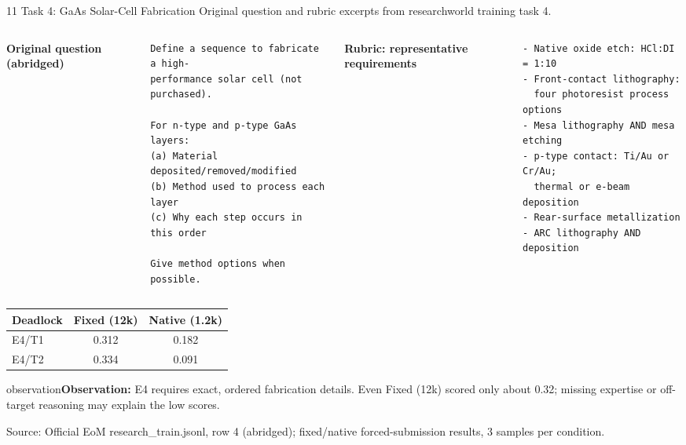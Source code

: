 \documentclass[aspectratio=169,10pt]{beamer}
\newcommand{\observation}[1]{\vspace{2mm}\begin{beamercolorbox}[rounded=true,sep=1ex,wd=\textwidth]{observation}\small\textbf{Observation:} #1\end{beamercolorbox}}
\newcommand{\source}[1]{\vfill{\tiny\textcolor{muted}{Source: #1}}}
\begin{document}
\begin{frame}[fragile]{11 \quad Task 4: GaAs Solar-Cell Fabrication}
\scriptsize\textcolor{muted}{Original question and rubric excerpts from researchworld training task 4.}
\vspace{1mm}
\begin{columns}[T,totalwidth=\textwidth]
\textbf{Original question (abridged)}
\begin{lstlisting}[basicstyle=\ttfamily\fontsize{7.0}{8.3}\selectfont]
Define a sequence to fabricate a high-
performance solar cell (not purchased).

For n-type and p-type GaAs layers:
(a) Material deposited/removed/modified
(b) Method used to process each layer
(c) Why each step occurs in this order

Give method options when possible.
\end{lstlisting}
\textbf{Rubric: representative requirements}
\begin{lstlisting}[basicstyle=\ttfamily\fontsize{7.0}{8.3}\selectfont]
- Native oxide etch: HCl:DI = 1:10
- Front-contact lithography:
  four photoresist process options
- Mesa lithography AND mesa etching
- p-type contact: Ti/Au or Cr/Au;
  thermal or e-beam deposition
- Rear-surface metallization
- ARC lithography AND deposition
\end{lstlisting}
\end{columns}
\vspace{1mm}
\begin{center}
\begin{tabular}{lcc}
\toprule
Deadlock & Fixed (12k) & Native (1.2k)\\
\midrule
E4/T1 & 0.312 & 0.182\\
E4/T2 & 0.334 & 0.091\\
\bottomrule
\end{tabular}
\end{center}
\observation{E4 requires exact, ordered fabrication details. Even Fixed (12k) scored only about 0.32; missing expertise or off-target reasoning may explain the low scores.}
\source{Official EoM research\_train.jsonl, row 4 (abridged); fixed/native forced-submission results, 3 samples per condition.}
\end{frame}
\end{document}
